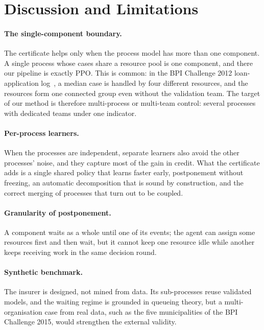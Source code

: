 \section{Discussion and Limitations}\label{sec:discussion}

\paragraph{The single-component boundary.} The certificate helps only when the process
model has more than one component. A single process whose cases share a resource pool
is one component, and there our pipeline is exactly PPO. This is common: in the BPI
Challenge 2012 loan-application log~\cite{bpic2012}, a median case is handled by four
different resources, and the resources form one connected group even without the
validation team. The target of our method is therefore multi-process or multi-team
control: several processes with dedicated teams under one indicator.

\paragraph{Per-process learners.} When the processes are independent, separate learners
also avoid the other processes' noise, and they capture most of the gain in credit. What
the certificate adds is a single shared policy that learns faster early,
postponement without freezing, an automatic decomposition that is sound by
construction, and the correct merging of processes that turn out to be coupled.

\paragraph{Granularity of postponement.} A component waits as a whole until one of its
events; the agent can assign some resources first and then wait, but it cannot keep one
resource idle while another keeps receiving work in the same decision round.

\paragraph{Synthetic benchmark.} The insurer is designed, not mined from data. Its
sub-processes reuse validated models, and the waiting regime is grounded in queueing
theory, but a multi-organisation case from real data, such as the five municipalities of
the BPI Challenge 2015, would strengthen the external validity. 
